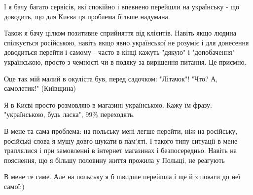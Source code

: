 \begin{itemize}
\begin{itemize}
І я бачу багато сервісів, які спокійно і впевнено перейшли на українську - що
доводить, що для Києва ця проблема більше надумана.

Також я бачу цілком позитивне сприйняття від клієнтів. Навіть якщо людина
спілкується російською, навіть якщо явно української не розуміє і для донесення
доводиться перейти і самому - часто в кінці кажуть "дякую" і "допобачення"
українською, просто з чемності чи в подяку за вирішення питання. Це приємно.

\end{itemize}

 
Оце так мій малий в окуліста був, перед садочком: "Літачок"! "Что? А, самолетик!" (Київщина)

 
Я в Києві просто розмовляю в магазині українською. Кажу їм фразу: "українською, будь ласка", 99\% переходять.

 

В мене та сама проблема: на польську мені легше перейти, ніж на російську,
російські слова я мушу довго шукати в пам'яті. І такого типу ситуації в мене
траплялися і при замовленні в інтернет магазинах і безпосередньо. Навіть на
пояснення, що я більшу половину життя прожила у Польщі, не реагують 🙁

\begin{itemize}
 
В мене те саме. Але на польську я б швидше перейшла і ще й з поваги до неї самої:)
\end{itemize}


\end{itemize}
